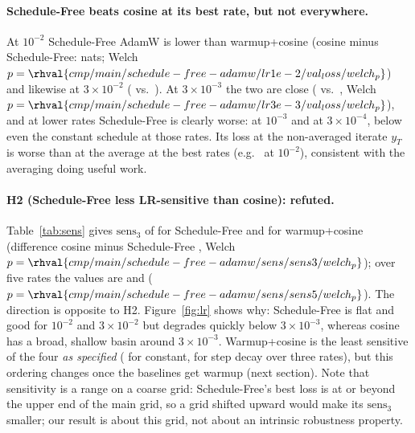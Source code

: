 \paragraph{Schedule-Free beats cosine at its best rate, but not everywhere.} At $10^{-2}$ Schedule-Free AdamW is lower than warmup+cosine (cosine minus Schedule-Free:  nats; Welch $p=\rhval{cmp/main/schedule-free-adamw/lr1e-2/val_loss/welch_p}$) and likewise at $3\times10^{-2}$ ( vs.\ ). At $3\times10^{-3}$ the two are close ( vs.\ , Welch $p=\rhval{cmp/main/schedule-free-adamw/lr3e-3/val_loss/welch_p}$), and at lower rates Schedule-Free is clearly worse:  at $10^{-3}$ and  at $3\times10^{-4}$, below even the constant schedule at those rates. Its loss at the non-averaged iterate $y_T$ is worse than at the average at the best rates (e.g.\  at $10^{-2}$), consistent with the averaging doing useful work.

\begin{table}[t]\centering\caption{Sensitivity: worst-minus-best validation loss over three ($\text{sens}_3$) and five ($\text{sens}_5$) peak rates, and best three-rate loss (best$_3$), mean $\pm$ std over seeds (lower is better).}\label{tab:sens}
\resizebox{\columnwidth}{!}{}\end{table}

\paragraph{H2 (Schedule-Free less LR-sensitive than cosine): refuted.} Table~\ref{tab:sens} gives $\text{sens}_3$ of  for Schedule-Free and  for warmup+cosine (difference cosine minus Schedule-Free , Welch $p=\rhval{cmp/main/schedule-free-adamw/sens/sens3/welch_p}$); over five rates the values are  and  ($p=\rhval{cmp/main/schedule-free-adamw/sens/sens5/welch_p}$). The direction is opposite to H2. Figure~\ref{fig:lr} shows why: Schedule-Free is flat and good for $10^{-2}$ and $3\times10^{-2}$ but degrades quickly below $3\times10^{-3}$, whereas cosine has a broad, shallow basin around $3\times10^{-3}$. Warmup+cosine is the least sensitive of the four \emph{as specified} ( for constant,  for step decay over three rates), but this ordering changes once the baselines get warmup (next section). Note that sensitivity is a range on a coarse grid: Schedule-Free's best loss is at or beyond the upper end of the main grid, so a grid shifted upward would make its $\text{sens}_3$ smaller; our result is about this grid, not about an intrinsic robustness property.

